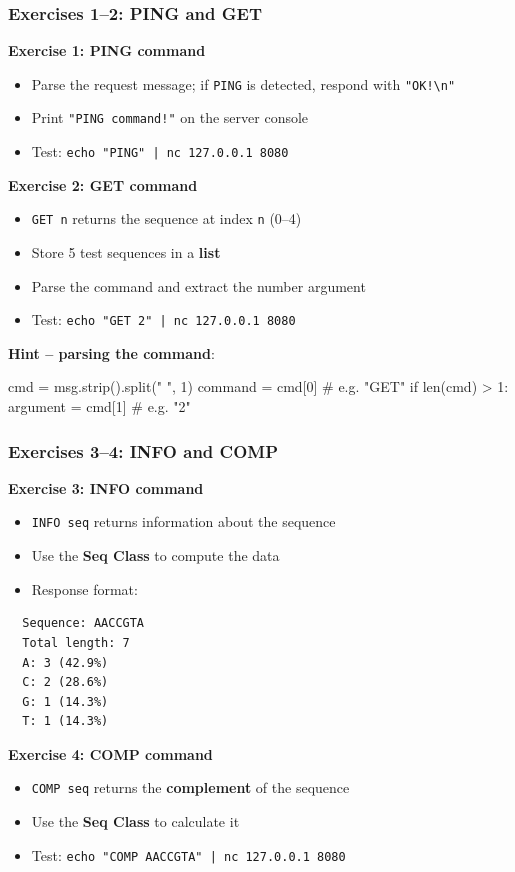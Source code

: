 \documentclass[xcolor=table]{beamer}
\begin{document}
\begin{frame}[fragile]
\frametitle{Exercises 1--2: PING and GET}

\textbf{Exercise 1: PING command}
\begin{itemize}
\item Parse the request message; if \texttt{PING} is detected, respond with \texttt{"OK!\textbackslash n"}
\item Print \texttt{"PING command!"} on the server console
\item Test: \texttt{echo "PING" | nc 127.0.0.1 8080}
\end{itemize}

\vspace{0.3cm}

\textbf{Exercise 2: GET command}
\begin{itemize}
\item \texttt{GET n} returns the sequence at index \texttt{n} (0--4)
\item Store 5 test sequences in a \textbf{list}
\item Parse the command and extract the number argument
\item Test: \texttt{echo "GET 2" | nc 127.0.0.1 8080}
\end{itemize}

\vspace{0.2cm}

\textbf{Hint -- parsing the command}:

\begin{python}
cmd = msg.strip().split(" ", 1)
command = cmd[0]  # e.g. "GET"
if len(cmd) > 1:
    argument = cmd[1]  # e.g. "2"
\end{python}

\end{frame}

\begin{frame}[fragile]
\frametitle{Exercises 3--4: INFO and COMP}

\textbf{Exercise 3: INFO command}
\begin{itemize}
\item \texttt{INFO seq} returns information about the sequence
\item Use the \textbf{Seq Class} to compute the data
\item Response format:
\end{itemize}

\begin{verbatim}
  Sequence: AACCGTA
  Total length: 7
  A: 3 (42.9%)
  C: 2 (28.6%)
  G: 1 (14.3%)
  T: 1 (14.3%)
\end{verbatim}

\vspace{0.2cm}

\textbf{Exercise 4: COMP command}
\begin{itemize}
\item \texttt{COMP seq} returns the \textbf{complement} of the sequence
\item Use the \textbf{Seq Class} to calculate it
\item Test: \texttt{echo "COMP AACCGTA" | nc 127.0.0.1 8080}
\end{itemize}

\end{frame}
\end{document}
